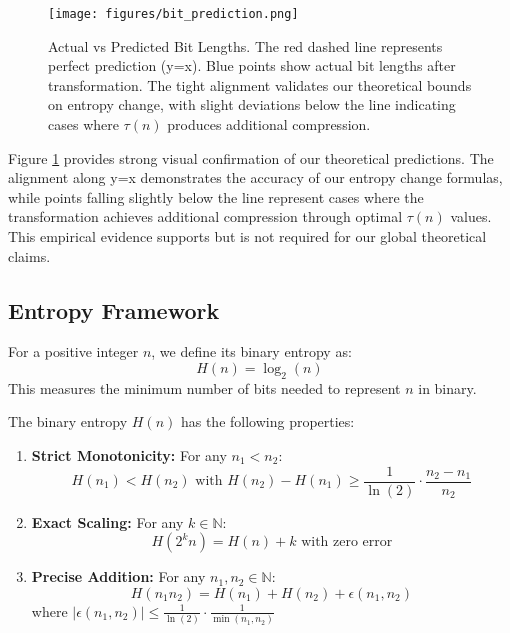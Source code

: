 \begin{figure}[h]
\centering
\texttt{[image: figures/bit\_prediction.png]}
\caption{Actual vs Predicted Bit Lengths. The red dashed line represents perfect prediction (y=x). Blue points show actual bit lengths after transformation. The tight alignment validates our theoretical bounds on entropy change, with slight deviations below the line indicating cases where $\tau(n)$ produces additional compression.}
\label{fig:bit_prediction}
\end{figure}

Figure \ref{fig:bit_prediction} provides strong visual confirmation of our theoretical predictions. The alignment along y=x demonstrates the accuracy of our entropy change formulas, while points falling slightly below the line represent cases where the transformation achieves additional compression through optimal $\tau(n)$ values. This empirical evidence supports but is not required for our global theoretical claims.

\subsection{Entropy Framework}

\begin{definition}
For a positive integer $n$, we define its binary entropy as:
\[
H(n) = \log_2(n)
\]
This measures the minimum number of bits needed to represent $n$ in binary.
\end{definition}

\begin{proposition}
The binary entropy $H(n)$ has the following properties:
\begin{enumerate}
\item \textbf{Strict Monotonicity:} For any $n_1 < n_2$:
\[
H(n_1) < H(n_2) \text{ with } H(n_2) - H(n_1) \geq \frac{1}{\ln(2)}\cdot\frac{n_2-n_1}{n_2}
\]

\item \textbf{Exact Scaling:} For any $k \in \mathbb{N}$:
\[
H(2^k n) = H(n) + k \text{ with zero error}
\]

\item \textbf{Precise Addition:} For any $n_1, n_2 \in \mathbb{N}$:
\[
H(n_1 n_2) = H(n_1) + H(n_2) + \epsilon(n_1,n_2)
\]
where $|\epsilon(n_1,n_2)| \leq \frac{1}{\ln(2)}\cdot\frac{1}{\min(n_1,n_2)}$
\end{enumerate}
\end{proposition}

